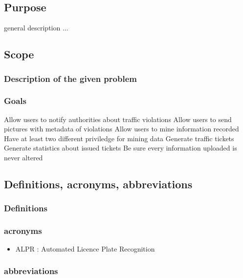 




\subsection{Purpose}
general description ...

\subsection{Scope}

\subsubsection{Description of the given problem}


\subsubsection{Goals}
\begin{enumerate}
   Allow users to notify authorities about traffic violations
   Allow users to send pictures with metadata of violations
   Allow users to mine information recorded
   Have at least two different  priviledge for mining data
   Generate traffic tickets
   Generate statistics about issued tickets
   Be sure every information uploaded is never altered
\end{enumerate}



\subsection{Definitions,  acronyms,  abbreviations}

\subsubsection{Definitions}
\subsubsection{acronyms}
\begin{itemize}
  \item ALPR : Automated Licence Plate Recognition
\end{itemize}

\subsubsection{abbreviations}


